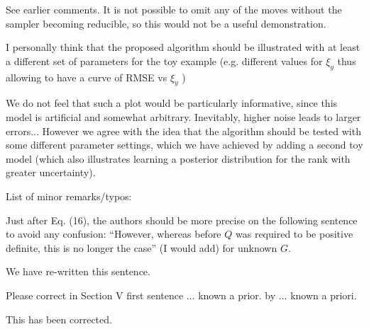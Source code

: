 \documentclass{article}
\newenvironment{review}[0]{\begin{itshape}\color{Gray}\noindent}{\end{itshape}\vspace{0.4cm}}
\newenvironment{response}[0]{\noindent}{\vspace{0.4cm}}
\begin{document}
\begin{response}
 See earlier comments. It is not possible to omit any of the moves without the sampler becoming reducible, so this would not be a useful demonstration.
\end{response}

\begin{review}
I personally think that the proposed algorithm should be illustrated with at least a different set of parameters for the toy example (e.g. different values for $\xi_y$ thus allowing to have a curve of RMSE vs $\xi_y$ )
\end{review}

\begin{response}
We do not feel that such a plot would be particularly informative, since this model is artificial and somewhat arbitrary. Inevitably, higher noise leads to larger errors... However we agree with the idea that the algorithm should be tested with some different parameter settings, which we have achieved by adding a second toy model (which also illustrates learning a posterior distribution for the rank with greater uncertainty).
\end{response}

\begin{review}
List of minor remarks/typos:

Just after Eq. (16), the authors should be more precise on the following sentence to avoid any confusion: ``However, whereas before $Q$ was required to be positive definite, this is no longer the case'' (I would add) for unknown $G$.
\end{review}

\begin{response}
 We have re-written this sentence. 
\end{response}

\begin{review}
Please correct in Section V first sentence ... known a prior. by ... known a priori.
\end{review}

\begin{response}
This has been corrected.
\end{response}
\end{document}
